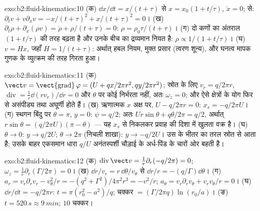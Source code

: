\begin{solution}{exo:b2:fluid-kinematics:10}
(क) $\dd x/\dd t = x/(t + \tau)$ से $x = x_0(1 + t/\tau)$, $\ddot x = 0$;
 से: $\partial_tv + v\partial_xv = -x/(t + \tau)^2 + x/(t + \tau)^2
= 0$। (ख) $\partial_t\rho + \partial_x(\rho v) = \dot\rho + \rho/(t + \tau) = 0$: $\rho =
\rho_0\tau/(t + \tau)$। (ग) दो कणों का अंतराल $(1 + t/\tau)$ की तरह बढ़ता है
और उनके बीच का द्रव्यमान नियत है: $\rho \propto 1/(1 + t/\tau)$। (घ) $v =
Hx$, जहाँ $H = 1/(t + \tau)$: अर्थात् हबल नियम, मुक्त प्रसार (त्वरण
शून्य), और घनत्व मापक गुणक के व्युत्क्रम की तरह गिरता हुआ।
\end{solution}

\begin{solution}{exo:b2:fluid-kinematics:11}
(क) $\vect v = \operatorname{\vect{grad}}\varphi = (U + qx/2\pi r^2, qy/2\pi r^2)$;
स्रोत के लिए $v_r = q/2\pi r$, $\operatorname{div} = \frac1r\dd(rv_r)/\dd r
= 0$ और $\theta$ पर कोई निर्भरता नहीं, अतः $\omega_z = 0$; और ऐसे क्षेत्रों के योग
फिर से असंपीड्य तथा अघूर्णी होते हैं। (ख) ऋणात्मक $x$ अक्ष पर,
$U - q/2\pi r = 0$: $x_s = -q/2\pi U$। (ग) स्थगन बिंदु पर $\theta =
\pi$, $y = 0$: $\psi = q/2$; अतः  $Ur\sin\theta + q\theta/2\pi = q/2$,
अर्थात् $r\sin\theta = (q/2\pi U)(\pi - \theta)$ --- यह $x_s$ से निकलकर
प्रवाह की दिशा में खुलता वक्र है। (घ) $\theta \to 0$: $y \to q/2U$; $\theta \to 2\pi$ (निचली
शाखा): $y \to -q/2U$। उस  के भीतर का तरल स्रोत से आता
है; उसके बाहर एकसमान धारा $q/U$ अनंतस्पर्शी चौड़ाई के अर्ध-पिंड के
चारों ओर बहती है।
\end{solution}

\begin{solution}{exo:b2:fluid-kinematics:12}
(क) $\operatorname{div}\vect v = \frac1r\partial_r(-q/2\pi) = 0$; $\omega_z =
\frac1r\partial_r(\Gamma/2\pi) = 0$। (ख) $\dd r/v_r = r\,\dd\theta/v_\theta$ से
$\dd r/r = -(q/\Gamma)\dd\theta$। (ग) $a_r = v_r\partial_rv_r - v_\theta^2/r =
-(q^2 + \Gamma^2)/4\pi^2r^3 = -v^2/r$; $a_\theta = v_r\partial_rv_\theta + v_rv_\theta/r
= 0$। (घ) $\dd r/\dd t = -q/2\pi r$: $t = \pi(r_0^2 - a^2)/q$; चक्कर
$= (\Gamma/2\pi q)\ln(r_0/a)$। (ङ) $t = \qty{520}{s} \approx \qty{9}{min}$; $10$
चक्कर।
\end{solution}

